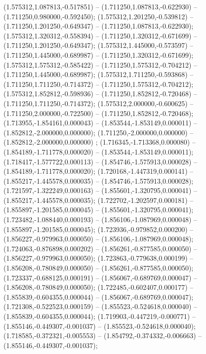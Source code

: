  (1.575312,1.087813,-0.517851) -- (1.711250,1.087813,-0.622930) -- (1.711250,0.980000,-0.592450);
 (1.575312,1.201250,-0.539812) -- (1.711250,1.201250,-0.649347) -- (1.711250,1.087813,-0.622930);
 (1.575312,1.320312,-0.558394) -- (1.711250,1.320312,-0.671699) -- (1.711250,1.201250,-0.649347);
 (1.575312,1.445000,-0.573597) -- (1.711250,1.445000,-0.689987) -- (1.711250,1.320312,-0.671699);
 (1.575312,1.575312,-0.585422) -- (1.711250,1.575312,-0.704212) -- (1.711250,1.445000,-0.689987);
 (1.575312,1.711250,-0.593868) -- (1.711250,1.711250,-0.714372) -- (1.711250,1.575312,-0.704212);
 (1.575312,1.852812,-0.598936) -- (1.711250,1.852812,-0.720468) -- (1.711250,1.711250,-0.714372);
 (1.575312,2.000000,-0.600625) -- (1.711250,2.000000,-0.722500) -- (1.711250,1.852812,-0.720468);
 (1.713955,-1.854161,0.000043) -- (1.853544,-1.853149,0.000011) -- (1.852812,-2.000000,0.000000);
 (1.711250,-2.000000,0.000000) -- (1.852812,-2.000000,0.000000) ;
 (1.716345,-1.713368,0.000080) -- (1.854189,-1.711778,0.000020) -- (1.853544,-1.853149,0.000011);
 (1.718417,-1.577722,0.000113) -- (1.854746,-1.575913,0.000028) -- (1.854189,-1.711778,0.000020);
 (1.720168,-1.447319,0.000141) -- (1.855217,-1.445578,0.000035) -- (1.854746,-1.575913,0.000028);
 (1.721597,-1.322249,0.000163) -- (1.855601,-1.320795,0.000041) -- (1.855217,-1.445578,0.000035);
 (1.722702,-1.202597,0.000181) -- (1.855897,-1.201585,0.000045) -- (1.855601,-1.320795,0.000041);
 (1.723482,-1.088440,0.000193) -- (1.856106,-1.087969,0.000048) -- (1.855897,-1.201585,0.000045);
 (1.723936,-0.979852,0.000200) -- (1.856227,-0.979963,0.000050) -- (1.856106,-1.087969,0.000048);
 (1.724063,-0.876898,0.000202) -- (1.856261,-0.877585,0.000050) -- (1.856227,-0.979963,0.000050);
 (1.723863,-0.779638,0.000199) -- (1.856208,-0.780849,0.000050) -- (1.856261,-0.877585,0.000050);
 (1.723337,-0.688125,0.000191) -- (1.856067,-0.689769,0.000047) -- (1.856208,-0.780849,0.000050);
 (1.722485,-0.602407,0.000177) -- (1.855839,-0.604355,0.000044) -- (1.856067,-0.689769,0.000047);
 (1.721308,-0.522523,0.000159) -- (1.855523,-0.524618,0.000040) -- (1.855839,-0.604355,0.000044);
 (1.719903,-0.447219,-0.000771) -- (1.855146,-0.449307,-0.001037) -- (1.855523,-0.524618,0.000040);
 (1.718585,-0.372321,-0.005553) -- (1.854792,-0.374332,-0.006663) -- (1.855146,-0.449307,-0.001037);
